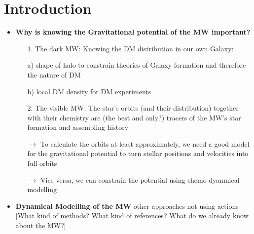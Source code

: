 \section{Introduction} \label{sec:intro}

\begin{itemize}

\item \textbf{Why is knowing the Gravitational potential of the MW important?}
\begin{itemize}
\item[1.] The dark MW: Knowing the DM distribution in our own Galaxy:
\item[a)] shape of halo to constrain theories of Galaxy formation and therefore the nature of DM
\item[b)] local DM density for DM experiments
\item[2.] The visible MW: The star's orbits (and their distribution) together with their chemistry are (the best and only?) tracers of the MW's star formation and assembling history
\item[$\rightarrow$] To calculate the orbits at least approximately, we need a good model for the gravitational potential to turn stellar positions and velocities into full orbits
\item[$\rightarrow$] Vice versa, we can constrain the potential using chemo-dyanmical modelling
\end{itemize}

\item \textbf{Dynamical Modelling of the MW} other approaches not using actions [What kind of methods? What kind of references? What do we already know about the MW?]


\end{itemize}
